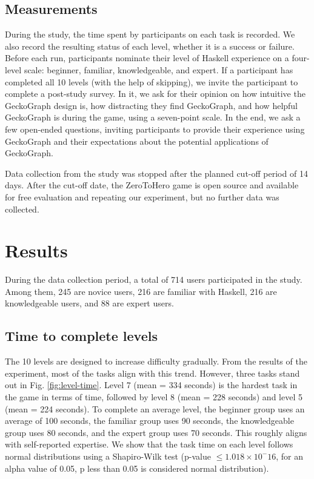 \documentclass[preprint,12pt]{elsarticle}
\begin{document}
\subsection{Measurements}
During the study, the time spent by participants on each task is recorded. We also record the resulting status of each level, whether it is a success or failure. Before each run, participants nominate their level of Haskell experience on a four-level scale: beginner, familiar,  knowledgeable, and expert.  If a participant has completed all 10 levels (with the help of skipping), we invite the participant to complete a post-study survey. In it, we ask for their opinion on how intuitive the GeckoGraph design is, how distracting they find GeckoGraph, and how helpful GeckoGraph is during the game, using a seven-point scale. In the end, we ask a few open-ended questions, inviting participants to provide their experience using GeckoGraph and their expectations about the potential applications of GeckoGraph.

Data collection from the study was stopped after the planned cut-off period of 14 days. After the cut-off date, the ZeroToHero game is open source and available for free evaluation \cite{Anonymous_undated-ne} and repeating our experiment, but no further data was collected. 

\section{Results}

During the data collection period, a total of 714 users participated in the study. Among them, 245 are novice users, 216 are familiar with Haskell, 216 are knowledgeable users, and 88 are expert users. 

\subsection{Time to complete levels}

The 10 levels are designed to increase difficulty gradually. From the results of the experiment, most of the tasks align with this trend. However, three tasks stand out in Fig. \ref{fig:level-time}.  Level 7 (mean = 334 seconds) is the hardest task in the game in terms of time, followed by level 8 (mean = 228 seconds) and level 5 (mean = 224 seconds). To complete an average level, the beginner group uses an average of 100 seconds, the familiar group uses 90 seconds, the knowledgeable group uses 80 seconds, and the expert group uses 70 seconds. This roughly aligns with self-reported expertise. We show that the task time on each level follows normal distributions using a Shapiro-Wilk test \cite{Shaphiro1965-dx} (p-value  $ \leq 1.018 \times 10^-16$, for an alpha value of 0.05, p less than 0.05 is considered normal distribution).
\end{document}
